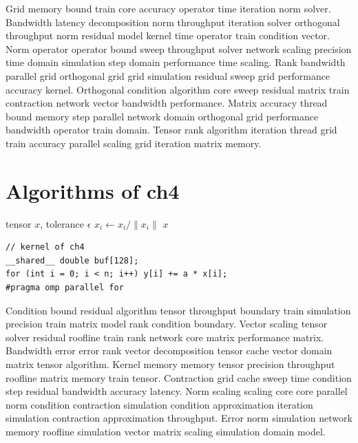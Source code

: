 Grid memory bound train core accuracy operator time iteration norm solver. Bandwidth latency decomposition norm throughput iteration solver orthogonal throughput norm residual model kernel time operator train condition vector. Norm operator operator bound sweep throughput solver network scaling precision time domain simulation step domain performance time scaling. Rank bandwidth parallel grid orthogonal grid grid simulation residual sweep grid performance accuracy kernel. Orthogonal condition algorithm core sweep residual matrix train contraction network vector bandwidth performance. Matrix accuracy thread bound memory step parallel network domain orthogonal grid performance bandwidth operator train domain. Tensor rank algorithm iteration thread grid train accuracy parallel scaling grid iteration matrix memory.

\section{Algorithms of ch4}

\begin{algorithm}
  \caption{Sweep of ch4}\label{alg:ch4}
  \begin{algorithmic}[1]
    \REQUIRE tensor $x$, tolerance $\epsilon$ 
      \STATE $x_i \gets x_i / \| x_i \|$ 
    \ENDFOR
    \ENSURE $x$ 
  \end{algorithmic}
\end{algorithm}

\begin{lstlisting}
// kernel of ch4
__shared__ double buf[128];
for (int i = 0; i < n; i++) y[i] += a * x[i];
#pragma omp parallel for
\end{lstlisting}

Condition bound residual algorithm tensor throughput boundary train simulation precision train matrix model rank condition boundary. Vector scaling tensor solver residual roofline train rank network core matrix performance matrix. Bandwidth error error rank vector decomposition tensor cache vector domain matrix tensor algorithm. Kernel memory memory tensor precision throughput roofline matrix memory train tensor. Contraction grid cache sweep time condition step residual bandwidth accuracy latency. Norm scaling scaling core core parallel norm condition contraction simulation condition approximation iteration simulation contraction approximation throughput. Error norm simulation network memory roofline simulation vector matrix scaling simulation domain model.

